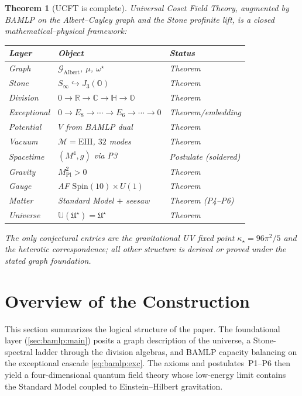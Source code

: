 \documentclass[11pt]{article}
\theoremstyle{plain}
\newtheorem{theorem}{Theorem}[section]
\theoremstyle{definition}
\theoremstyle{remark}
\begin{document}
\begin{theorem}[UCFT is complete]\label{thm:identification:complete}
Universal Coset Field Theory, augmented by BAMLP on the Albert--Cayley graph
and the Stone profinite lift, is a closed mathematical--physical framework:
\begin{center}
\small
\begin{tabular}{@{}lll@{}}
\toprule
Layer & Object & Status \\
\midrule
Graph & $\mathcal{G}_{\mathrm{Albert}}$, $\mu$, $\omega^\star$ & Theorem \\
Stone & $S_\infty\hookrightarrow J_3(\mathbb{O})$ & Theorem \\
Division & $0\to\mathbb{R}\to\mathbb{C}\to\mathbb{H}\to\mathbb{O}$ & Theorem \\
Exceptional & $0\to E_8\to\cdots\to E_6\to\cdots\to 0$ & Theorem/embedding \\
Potential & $V$ from BAMLP dual & Theorem \\
Vacuum & $\mathcal{M}=\mathrm{EIII}$, $32$ modes & Theorem \\
Spacetime & $(M^4,g)$ via P3 & Postulate (soldered) \\
Gravity & $M_{\mathrm{Pl}}^2>0$ & Theorem \\
Gauge & AF $\mathrm{Spin}(10)\times U(1)$ & Theorem \\
Matter & Standard Model $+$ seesaw & Theorem (P4--P6) \\
Universe & $\mathbb{U}(\mathfrak{U}^\star)=\mathfrak{U}^\star$ & Theorem \\
\bottomrule
\end{tabular}
\end{center}
The only conjectural entries are the gravitational UV fixed point
$\kappa_\star=96\pi^2/5$ and the heterotic correspondence; all other structure
is derived or proved under the stated graph foundation.
\end{theorem}%
\section{Overview of the Construction}
\label{sec:master:chain}

This section summarizes the logical structure of the paper. The foundational
layer (\autoref{sec:bamlp:main}) posits a graph description of the universe,
a Stone-spectral ladder through the division algebras, and BAMLP capacity
balancing on the exceptional cascade
\eqref{eq:bamlp:exc}. The axioms and postulates~\textnormal{P1--P6} then yield a
four-dimensional quantum field theory whose low-energy limit contains the
Standard Model coupled to Einstein--Hilbert gravitation.
\end{document}
